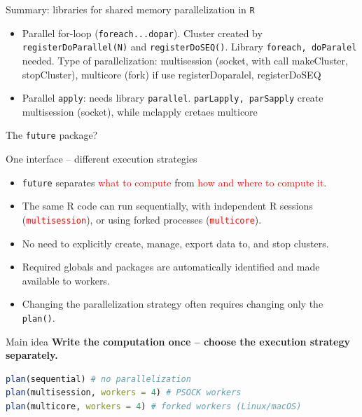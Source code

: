 \documentclass[compress,xcolor=table]{beamer}
\newcommand{\CoG}{\textcolor{red}}
\newcommand{\pp}{\pause}
\begin{document}
\begin{frame}{Summary: libraries for shared memory parallelization in {\tt R}}
\begin{itemize}
	\item Parallel for-loop ({\tt foreach...dopar}). Cluster created by {\tt registerDoParallel(N)} and {\tt registerDoSEQ()}. Library {\tt foreach, doParalel} needed. Type of parallelization: multisession (socket, with call makeCluster, stopCluster), multicore (fork) if use registerDoparalel, registerDoSEQ
	\item Parallel {\tt apply}:  needs library {\tt parallel}. {\tt parLapply, parSapply} create multisession (socket), while mclapply cretaes multicore 
\end{itemize}
\end{frame}



\begin{frame}[fragile]{The \texttt{future} package?} 
	\begin{block}{One interface -- different execution strategies} 
\footnotesize 
	\begin{itemize}
		\item \texttt{future} separates \CoG{what to compute} from \CoG{how and where to compute it}. 
		\item The same R code can run sequentially, with independent R sessions (\CoG{\texttt{multisession}}), or using forked processes (\CoG{\texttt{multicore}}). 
		\item No need to explicitly create, manage, export data to, and stop clusters. 
		\item Required globals and packages are automatically identified and made available to workers. 
		\item Changing the parallelization strategy often requires changing only the \texttt{plan()}. 
		\end{itemize} 
		\begin{alertblock}{Main idea} \centering \textbf{Write the computation once -- choose the execution strategy separately.} 
		\end{alertblock} 
\pp
		\begin{lstlisting}[language=R] 
plan(sequential) # no parallelization 
plan(multisession, workers = 4) # PSOCK workers 
plan(multicore, workers = 4) # forked workers (Linux/macOS) 
\end{lstlisting} 
\end{block} 
\end{frame}
\end{document}
